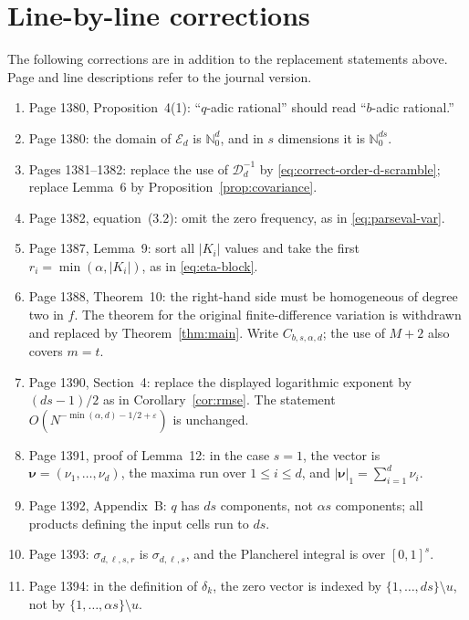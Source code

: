 \documentclass[11pt]{article}
\newcommand{\Nzero}{\mathbb N_0}
\newcommand{\D}{\mathcal D}
\newcommand{\E}{\mathcal E}
\newcommand{\abs}[1]{\lvert #1\rvert}
\newcommand{\eps}{\varepsilon}
\begin{document}
\section{Line-by-line corrections}\label{sec:line-corrections}

The following corrections are in addition to the replacement statements above.
Page and line descriptions refer to the journal version.

\begin{enumerate}[leftmargin=2.5em]
\item Page 1380, Proposition~4(1): ``$q$-adic rational'' should read
      ``$b$-adic rational.''
\item Page 1380: the domain of $\E_d$ is $\Nzero^d$, and in $s$ dimensions it is
      $\Nzero^{ds}$.
\item Pages 1381--1382: replace the use of $\D_d^{-1}$ by
      \eqref{eq:correct-order-d-scramble}; replace Lemma~6 by
      Proposition~\ref{prop:covariance}.
\item Page 1382, equation~(3.2): omit the zero frequency, as in
      \eqref{eq:parseval-var}.
\item Page 1387, Lemma~9: sort all $\abs{K_i}$ values and take the first
      $r_i=\min(\alpha,\abs{K_i})$, as in \eqref{eq:eta-block}.
\item Page 1388, Theorem~10: the right-hand side must be homogeneous of
      degree two in $f$.  The theorem for the original finite-difference
      variation is withdrawn and replaced by Theorem~\ref{thm:main}.  Write
      $C_{b,s,\alpha,d}$; the use of $M+2$ also covers $m=t$.
\item Page 1390, Section~4: replace the displayed logarithmic exponent by $(ds-1)/2$ as in Corollary~\ref{cor:rmse}.  The statement
      $O(N^{-\min(\alpha,d)-1/2+\eps})$ is unchanged.
\item Page 1391, proof of Lemma~12: in the case $s=1$, the vector is
      $\boldsymbol\nu=(\nu_1,\ldots,\nu_d)$, the maxima run over
      $1\le i\le d$, and $\abs{\boldsymbol\nu}_1=\sum_{i=1}^d\nu_i$.
\item Page 1392, Appendix~B: $q$ has $ds$ components, not $\alpha s$
      components; all products defining the input cells run to $ds$.
\item Page 1393: $\sigma_{d,\boldsymbol\ell,s,r}$ is
      $\sigma_{d,\boldsymbol\ell,s}$, and the Plancherel integral is over
      $[0,1]^s$.
\item Page 1394: in the definition of $\delta_k$, the zero vector is indexed by
      $\{1,\ldots,ds\}\setminus u$, not by $\{1,\ldots,\alpha s\}\setminus u$.

\end{enumerate}
\end{document}
